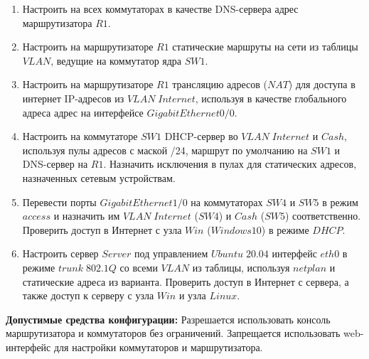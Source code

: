 \begin{enumerate}
    \item Настроить на всех коммутаторах в качестве DNS-сервера адрес маршрутизатора $R1$.
    \item Настроить на маршрутизаторе $R1$ статические маршруты на сети из таблицы $VLAN$, ведущие на коммутатор ядра $SW1$.
    \item Настроить на маршрутизаторе $R1$ трансляцию адресов ($NAT$) для доступа в интернет IP-адресов из $VLAN\;Internet$, используя в качестве глобального адреса адрес на интерфейсе $GigabitEthernet0/0$.
    \item Настроить на коммутаторе $SW1$ DHCP-сервер во $VLAN\;Internet$ и $Cash$, используя пулы адресов с маской /24, маршрут по умолчанию на $SW1$ и DNS-сервер на $R1$. Назначить исключения в пулах для статических адресов, назначенных сетевым устройствам.
    \item Перевести порты $GigabitEthernet1/0$ на коммутаторах $SW4$ и $SW5$ в режим $access$ и назначить им $VLAN\;Internet$ ($SW4$) и $Cash$ ($SW5$) соответственно. Проверить доступ в Интернет с узла $Win$ ($Windows 10$) в режиме $DHCP$.
    \item Настроить сервер $Server$ под управлением $Ubuntu\;20.04$ интерфейс $eth0$ в режиме $trunk\;802.1Q$ со всеми $VLAN$ из таблицы, используя $netplan$ и статические адреса из варианта. Проверить доступ в Интернет с сервера, а также доступ к серверу с узла $Win$ и узла $Linux$.
\end{enumerate}

{\bfseries Допустимые средства конфигурации:} Разрешается использовать консоль маршрутизатора и коммутаторов без ограничений. Запрещается использовать web-интерфейс для настройки коммутаторов и маршрутизатора.

\pagebreak